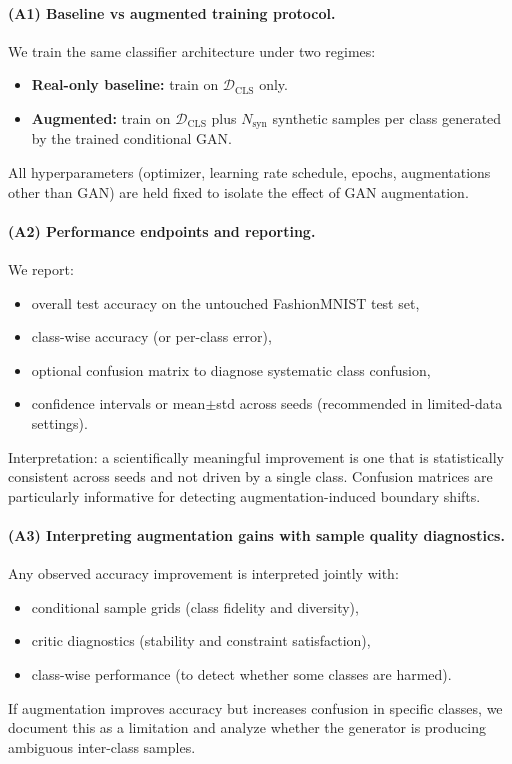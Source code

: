 \paragraph{(A1) Baseline vs augmented training protocol.}
We train the same classifier architecture under two regimes:
\begin{itemize}
  \item \textbf{Real-only baseline:} train on $\mathcal{D}_{\mathrm{CLS}}$ only.
  \item \textbf{Augmented:} train on $\mathcal{D}_{\mathrm{CLS}}$ plus $N_{\mathrm{syn}}$ synthetic samples per class generated by the trained conditional GAN.
\end{itemize}
All hyperparameters (optimizer, learning rate schedule, epochs, augmentations other than GAN) are held fixed to isolate the effect of GAN augmentation.

\paragraph{(A2) Performance endpoints and reporting.}
We report:
\begin{itemize}
  \item overall test accuracy on the untouched FashionMNIST test set,
  \item class-wise accuracy (or per-class error),
  \item optional confusion matrix to diagnose systematic class confusion,
  \item confidence intervals or mean$\pm$std across seeds (recommended in limited-data settings).
\end{itemize}
Interpretation: a scientifically meaningful improvement is one that is statistically consistent across seeds and not driven by a single class. Confusion matrices are particularly informative for detecting augmentation-induced boundary shifts.

\paragraph{(A3) Interpreting augmentation gains with sample quality diagnostics.}
Any observed accuracy improvement is interpreted jointly with:
\begin{itemize}
  \item conditional sample grids (class fidelity and diversity),
  \item critic diagnostics (stability and constraint satisfaction),
  \item class-wise performance (to detect whether some classes are harmed).
\end{itemize}
If augmentation improves accuracy but increases confusion in specific classes, we document this as a limitation and analyze whether the generator is producing ambiguous inter-class samples.

